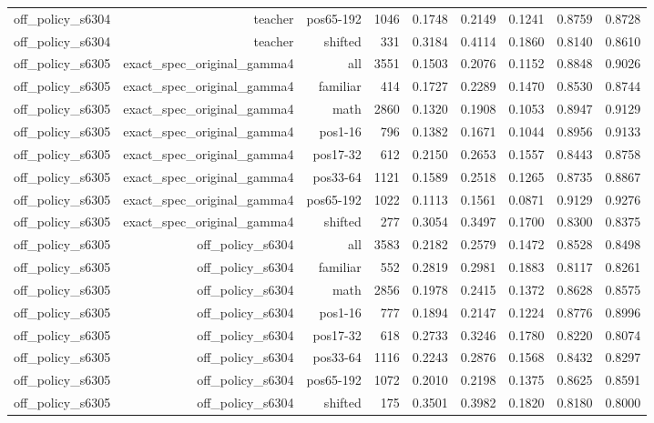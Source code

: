 \begin{tabular}{lrrrrrrrr}
off\_policy\_s6304 & teacher & pos65-192 & 1046 & 0.1748 & 0.2149 & 0.1241 & 0.8759 & 0.8728 \\
off\_policy\_s6304 & teacher & shifted & 331 & 0.3184 & 0.4114 & 0.1860 & 0.8140 & 0.8610 \\
off\_policy\_s6305 & exact\_spec\_original\_gamma4 & all & 3551 & 0.1503 & 0.2076 & 0.1152 & 0.8848 & 0.9026 \\
off\_policy\_s6305 & exact\_spec\_original\_gamma4 & familiar & 414 & 0.1727 & 0.2289 & 0.1470 & 0.8530 & 0.8744 \\
off\_policy\_s6305 & exact\_spec\_original\_gamma4 & math & 2860 & 0.1320 & 0.1908 & 0.1053 & 0.8947 & 0.9129 \\
off\_policy\_s6305 & exact\_spec\_original\_gamma4 & pos1-16 & 796 & 0.1382 & 0.1671 & 0.1044 & 0.8956 & 0.9133 \\
off\_policy\_s6305 & exact\_spec\_original\_gamma4 & pos17-32 & 612 & 0.2150 & 0.2653 & 0.1557 & 0.8443 & 0.8758 \\
off\_policy\_s6305 & exact\_spec\_original\_gamma4 & pos33-64 & 1121 & 0.1589 & 0.2518 & 0.1265 & 0.8735 & 0.8867 \\
off\_policy\_s6305 & exact\_spec\_original\_gamma4 & pos65-192 & 1022 & 0.1113 & 0.1561 & 0.0871 & 0.9129 & 0.9276 \\
off\_policy\_s6305 & exact\_spec\_original\_gamma4 & shifted & 277 & 0.3054 & 0.3497 & 0.1700 & 0.8300 & 0.8375 \\
off\_policy\_s6305 & off\_policy\_s6304 & all & 3583 & 0.2182 & 0.2579 & 0.1472 & 0.8528 & 0.8498 \\
off\_policy\_s6305 & off\_policy\_s6304 & familiar & 552 & 0.2819 & 0.2981 & 0.1883 & 0.8117 & 0.8261 \\
off\_policy\_s6305 & off\_policy\_s6304 & math & 2856 & 0.1978 & 0.2415 & 0.1372 & 0.8628 & 0.8575 \\
off\_policy\_s6305 & off\_policy\_s6304 & pos1-16 & 777 & 0.1894 & 0.2147 & 0.1224 & 0.8776 & 0.8996 \\
off\_policy\_s6305 & off\_policy\_s6304 & pos17-32 & 618 & 0.2733 & 0.3246 & 0.1780 & 0.8220 & 0.8074 \\
off\_policy\_s6305 & off\_policy\_s6304 & pos33-64 & 1116 & 0.2243 & 0.2876 & 0.1568 & 0.8432 & 0.8297 \\
off\_policy\_s6305 & off\_policy\_s6304 & pos65-192 & 1072 & 0.2010 & 0.2198 & 0.1375 & 0.8625 & 0.8591 \\
off\_policy\_s6305 & off\_policy\_s6304 & shifted & 175 & 0.3501 & 0.3982 & 0.1820 & 0.8180 & 0.8000 \\

\end{tabular}
